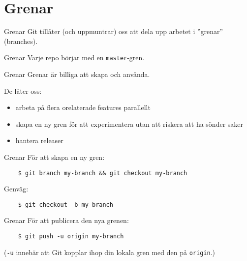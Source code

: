 \documentclass[11pt,xetex]{beamer}
\begin{document}
\section*{Grenar}

\begin{frame}{Grenar}
  \Large
  Git tillåter (och uppmuntrar) oss att dela upp arbetet i ''grenar''
  (branches).
\end{frame}

\begin{frame}{Grenar}
  \Large
  Varje repo börjar med en \texttt{master}-gren.
\end{frame}

\begin{frame}{Grenar}
  \Large
  Grenar är billiga att skapa och använda.

  De låter oss:

  \normalsize
  \begin{itemize}
    \item arbeta på flera orelaterade features parallellt
    \item skapa en ny gren för att experimentera utan att riskera att ha
        sönder saker
    \item hantera releaser
  \end{itemize}
\end{frame}

\begin{frame}[fragile]{Grenar}
  \Large
  För att skapa en ny gren:

  \begin{verbatim}
    $ git branch my-branch && git checkout my-branch
  \end{verbatim}

  Genväg:

  \begin{verbatim}
    $ git checkout -b my-branch
  \end{verbatim}
\end{frame}

\begin{frame}[fragile]{Grenar}
  \Large
  För att publicera den nya grenen:

  \begin{verbatim}
    $ git push -u origin my-branch
  \end{verbatim}

  \scriptsize
  (\texttt{-u} innebär att Git kopplar ihop din lokala gren med den
  på \texttt{origin}.)
\end{frame}
\end{document}

